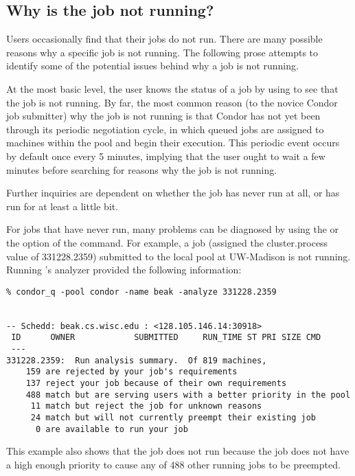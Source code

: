\subsection{\label{sec:job-not-running}Why is the job not running?}
Users occasionally find that their jobs do not run.
There are many possible reasons why a specific job is not running.
The following prose attempts to identify some of the potential issues
behind why a job is not running.

At the most basic level, the user knows the status of a job by
using  to see that the job is not running.
By far, the most common reason (to the novice Condor job submitter)
why the job is not running is that Condor has not yet 
been through its periodic negotiation cycle,
in which queued jobs are assigned to machines within the pool 
and begin their execution.
This periodic event occurs by default once every 5 minutes,
implying that the user ought to wait a few minutes before
searching for reasons why the job is not running.

Further inquiries are dependent on whether the job has 
never run at all, or has run for at least a little bit.

For jobs that have never run,
many problems can be diagnosed by using the 
or the  option of the  command.
For example, a job (assigned the cluster.process value of
331228.2359) submitted to the local pool at UW-Madison
is not running.
Running 's analyzer provided the following information:
\footnotesize
\begin{verbatim}
% condor_q -pool condor -name beak -analyze 331228.2359


-- Schedd: beak.cs.wisc.edu : <128.105.146.14:30918>
 ID      OWNER            SUBMITTED     RUN_TIME ST PRI SIZE CMD
 ---
331228.2359:  Run analysis summary.  Of 819 machines,
    159 are rejected by your job's requirements
    137 reject your job because of their own requirements
    488 match but are serving users with a better priority in the pool
     11 match but reject the job for unknown reasons
     24 match but will not currently preempt their existing job
      0 are available to run your job
\end{verbatim}
\normalsize

This example also shows that the job does not run because the job
does not have a high enough priority to cause any of 488 other running jobs
to be preempted.

